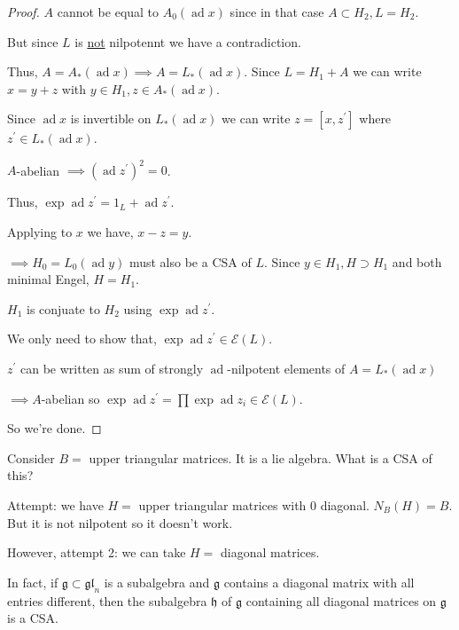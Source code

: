 \documentclass{article}
\theoremstyle{definition}
\begin{document}
\begin{proof}
        \(A\) cannot be equal to \(A_0(\operatorname{ad} x)\) since in that case \(A \subset H_2, L = H_2\).

        But since \(L\) is \underline{not} nilpotennt we have a contradiction.

        Thus, \(A = A_{\ast} (\operatorname{ad} x) \implies A = L_{\ast} (\operatorname{ad} x)\). Since \(L = H_1 + A\) we can write \(x = y+z\) with \(y\in H_1, z \in A_{\ast} (\operatorname{ad} x)\).
        
        Since \(\operatorname{ad} x\) is invertible on \(L_{\ast} (\operatorname{ad} x)\) we can write \(z = [x,z^{\prime}]\) where \(z^{\prime} \in L_{\ast} (\operatorname{ad} x)\).
        
        \(A\)-abelian \(\implies (\operatorname{ad} z^{\prime})^2 = 0\).
        
        Thus, \(\exp \operatorname{ad} z^{\prime} = 1_L + \operatorname{ad} z^{\prime}\).

        Applying to \(x\) we have, \(x - z = y\).

        \(\implies H_0 = L_0(\operatorname{ad} y)\) must also be a CSA of \(L\). Since \(y\in H_1, H \supset H_1\) and both minimal Engel, \(H = H_1\).

        \(H_1\) is conjuate to \(H_2\) using \(\exp \operatorname{ad} z^{\prime}\).

        We only need to show that, \(\exp \operatorname{ad} z^{\prime} \in \mathscr{E} (L)\).

        \(z^{\prime} \) can be written as sum of strongly \(\operatorname{ad}\)-nilpotent elements of \(A = L_{\ast} (\operatorname{ad} x)\)
        
        \(\implies A\)-abelian so \(\exp \operatorname{ad} z^{\prime} = \prod \exp \operatorname{ad} z_i \in \mathscr{E} (L)\).

        So we're done.

    \end{proof}

    Consider \(B = \) upper triangular matrices. It is a lie algebra. What is a CSA of this?

    Attempt: we have \(H =\) upper triangular matrices with \(0\) diagonal. \(N_B (H) = B\). But it is not nilpotent so it doesn't work.

    However, attempt 2: we can take \(H = \) diagonal matrices.

    In fact, if \(\mathfrak{g} \subset \mathfrak{gl}_n\) is a subalgebra and \(\mathfrak{g}\) contains a diagonal matrix with all entries different, then the subalgebra \(\mathfrak{h}\) of \(\mathfrak{g}\) containing all diagonal matrices on \(\mathfrak{g}\) is a CSA.
\end{document}
